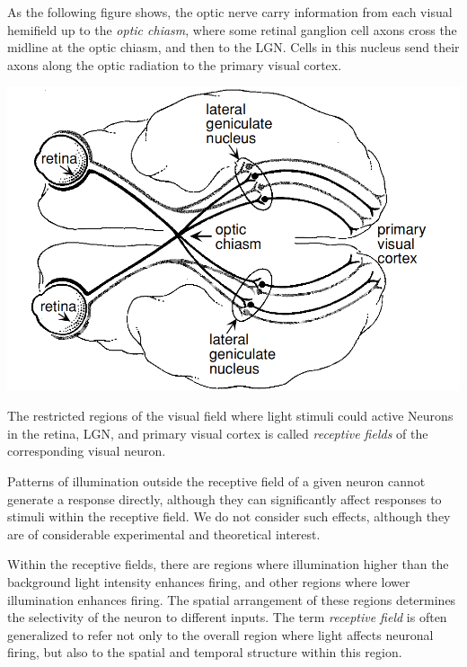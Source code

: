 \begin{prin}
  \label{prin:visualPathway}
  As the following figure shows, the optic nerve carry information from each visual hemifield up to the \emph{optic chiasm}, where some retinal ganglion cell axons cross the midline at the optic chiasm, and then to the LGN. Cells in this nucleus send their axons along the optic radiation to the primary visual cortex.
  \begin{center}
    \includegraphics[scale=0.2]{./png/visualPathway}
  \end{center}
\end{prin}

\begin{defn}
  \label{def:visualReceptiveField}
  The restricted regions of the visual field where light stimuli could active Neurons in the retina, LGN, and primary visual cortex is called \emph{receptive fields} of the corresponding visual neuron.
\end{defn}

\begin{asm}
  \label{asm:OutsideRecept}
  Patterns of illumination outside the receptive field of a given neuron cannot generate a response directly, although they can significantly affect responses to stimuli within the receptive field. We do not consider such effects, although they are of considerable experimental and theoretical interest.
\end{asm}

\begin{rem}
  Within the receptive fields, there are regions where illumination higher than the background light intensity enhances firing, and other regions where lower illumination enhances firing. The spatial arrangement of these regions determines the selectivity of the neuron to different inputs. The term \emph{receptive field} is often generalized to refer not only to the overall region where light affects neuronal firing, but also to the spatial and temporal structure within this region.
\end{rem}

